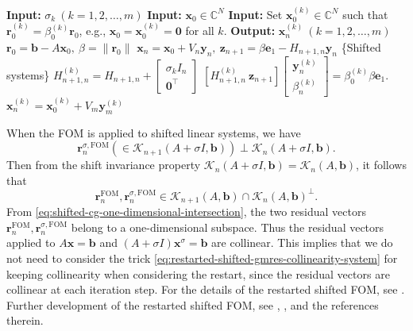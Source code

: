 \begin{algorithm}[H]\caption{{The restarted shifted GMRES method}}\label{alg:restarted-shifted-gmres}\begin{algorithmic}[1]
\Statex\textbf{Input:} $\sigma_k\ (k=1,2,\ldots,m)$
\Statex\textbf{Input:} $\bm x_0\in\mathbb C^N$
\Statex\textbf{Input:} {Set $\bm x_0^{(k)}\in\mathbb C^N$ such that $\bm r_0^{(k)}=\beta_0^{(k)}\bm r_0$, e.g., $\bm x_0=\bm x_0^{(k)}=\bm0$ for all $k$.}
\Statex\textbf{Output:} $\bm x_n^{(k)}\ (k=1,2,\ldots,m)$
\State $\bm r_0=\bm b-A\bm x_0,\ \beta=\|\bm r_0\|$
\State $\bm x_n=\bm x_0+V_n\bm y_n,\ \bm z_{n+1}=\beta\bm e_1-H_{n+1,n}\bm y_n$
\State \{{Shifted systems}\}
\State $H_{n+1,n}^{(k)}=H_{n+1,n}+\begin{bmatrix}\sigma_k I_n\\\bm0^{\top}\end{bmatrix}$
 $[H_{n+1,n}^{(k)}\ \bm z_{n+1}]\begin{bmatrix}\bm y_n^{(k)}\\\beta_n^{(k)}\end{bmatrix}=\beta_0^{(k)}\beta\bm e_1$.
\State $\bm x_n^{(k)}=\bm x_0^{(k)}+V_m\bm y_m^{(k)}$
\EndFor
{}
\EndIf\end{algorithmic}\end{algorithm}
{When the FOM is applied to shifted linear systems, we have}
\[\bm r_n^{\sigma,\mathrm{FOM}}(\in\mathcal K_{n+1}(A+\sigma I,\bm b))\perp\mathcal K_n(A+\sigma I,\bm b).\]
{Then from the shift invariance property $\mathcal K_n(A+\sigma I,\bm b)=\mathcal K_n(A,\bm b)$, it follows that}
\[\bm r_n^{\mathrm{FOM}},\bm r_n^{\sigma,\mathrm{FOM}}\in\mathcal K_{n+1}(A,\bm b)\cap\mathcal K_n(A,\bm b)^{\perp}.\]
{From \eqref{eq:shifted-cg-one-dimensional-intersection}, the two residual vectors $\bm r_n^{\mathrm{FOM}},\bm r_n^{\sigma,\mathrm{FOM}}$ belong to a one-dimensional subspace. Thus the residual vectors applied to $A\bm x=\bm b$ and $(A+\sigma I)\bm x^{\sigma}=\bm b$ are collinear. This implies that we do not need to consider the trick \eqref{eq:restarted-shifted-gmres-collinearity-system} for keeping collinearity when considering the restart, since the residual vectors are collinear at each iteration step. For the details of the restarted shifted FOM, see . Further development of the restarted shifted FOM, see , , and the references therein.}
